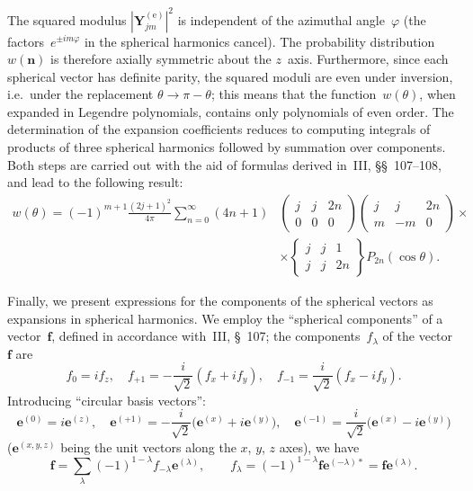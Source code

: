 The squared modulus $\left|\mathbf{Y}_{jm}^{(\text{e})}\right|^2$ is independent of the azimuthal angle~$\varphi$ (the factors~$e^{\pm im\varphi}$ in the spherical harmonics cancel). The probability distribution~$w(\mathbf{n})$ is therefore axially symmetric about the $z$~axis. Furthermore, since each spherical vector has definite parity, the squared moduli are even under inversion, i.e.\ under the replacement $\theta \to \pi - \theta$; this means that the function~$w(\theta)$, when expanded in Legendre polynomials, contains only polynomials of even order. The determination of the expansion coefficients reduces to computing integrals of products of three spherical harmonics followed by summation over components. Both steps are carried out with the aid of formulas derived in~III, \S\S~107--108, and lead
to the following result:
\begin{equation}
\begin{split}
w(\theta) = (-1)^{m+1}\frac{(2j+1)^2}{4\pi}\sum_{n=0}^{\infty}(4n+1) &\begin{pmatrix}j & j & 2n \\ 0 & 0 & 0\end{pmatrix}\begin{pmatrix}j & j & 2n \\ m & -m & 0\end{pmatrix} \times\\
&\times \begin{Bmatrix}j & j & 1 \\ j & j & 2n\end{Bmatrix} P_{2n}(\cos\theta).
\end{split}
\tag{7.12}
\end{equation}

Finally, we present expressions for the components of the spherical vectors as expansions in spherical harmonics. We employ the ``spherical components'' of a vector~$\mathbf{f}$, defined in accordance with~III, \S~107; the components~$f_\lambda$ of the vector~$\mathbf{f}$ are
\begin{equation}
f_0 = if_z, \quad f_{+1} = -\frac{i}{\sqrt{2}}(f_x + if_y), \quad f_{-1} = \frac{i}{\sqrt{2}}(f_x - if_y).
\tag{7.13}
\end{equation}
Introducing ``circular basis vectors'':
\begin{equation}
\mathbf{e}^{(0)} = i\mathbf{e}^{(z)},\quad \mathbf{e}^{(+1)} = -\frac{i}{\sqrt{2}}\bigl(\mathbf{e}^{(x)} + i\mathbf{e}^{(y)}\bigr),\quad \mathbf{e}^{(-1)} = \frac{i}{\sqrt{2}}\bigl(\mathbf{e}^{(x)} - i\mathbf{e}^{(y)}\bigr)
\tag{7.14}
\end{equation}
($\mathbf{e}^{(x,y,z)}$ being the unit vectors along the $x$, $y$, $z$ axes), we have
\begin{equation}
\mathbf{f} = \sum_\lambda (-1)^{1-\lambda}f_{-\lambda}\mathbf{e}^{(\lambda)}, \qquad f_\lambda = (-1)^{1-\lambda}\mathbf{f}\mathbf{e}^{(-\lambda)*} = \mathbf{f}\mathbf{e}^{(\lambda)}.
\tag{7.15}
\end{equation}

